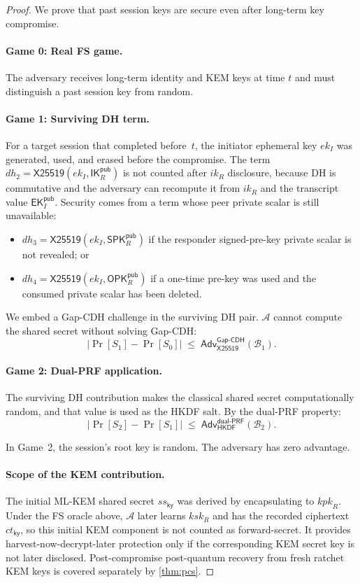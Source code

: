 \documentclass[11pt,a4paper]{article}
\theoremstyle{definition}
\theoremstyle{remark}
\newcommand{\adv}{\mathsf{Adv}}
\newcommand{\advA}{\mathcal{A}}
\newcommand{\advB}{\mathcal{B}}
\newcommand{\HKDF}{\mathsf{HKDF}}
\renewcommand{\DH}{\mathsf{X25519}}
\newcommand{\GapCDH}{\mathsf{Gap\text{-}CDH}}
\newcommand{\dualPRF}{\mathsf{dual\text{-}PRF}}
\newcommand{\IK}{\mathsf{IK}}
\newcommand{\SPK}{\mathsf{SPK}}
\newcommand{\EK}{\mathsf{EK}}
\newcommand{\OPK}{\mathsf{OPK}}
\begin{document}
\begin{proof}
We prove that past session keys are secure even after long-term key compromise.

\paragraph{Game 0: Real FS game.}
The adversary receives long-term identity and KEM keys at time $t$ and must
distinguish a past session key from random.

\paragraph{Game 1: Surviving DH term.}
For a target session that completed before~$t$, the initiator ephemeral key
$ek_I$ was generated, used, and erased before the compromise. The term
$\mathit{dh}_2=\DH(ek_I,\IK_R^{\mathsf{pub}})$ is not counted after $ik_R$
disclosure, because DH is commutative and the adversary can recompute it from
$ik_R$ and the transcript value $\EK_I^{\mathsf{pub}}$. Security comes from a
term whose peer private scalar is still unavailable:
\begin{itemize}[nosep]
  \item $\mathit{dh}_3 = \DH(ek_I, \SPK_R^{\mathsf{pub}})$ if the responder
        signed-pre-key private scalar is not revealed; or
  \item $\mathit{dh}_4 = \DH(ek_I, \OPK_R^{\mathsf{pub}})$ if a one-time
        pre-key was used and the consumed private scalar has been deleted.
\end{itemize}

We embed a Gap-CDH challenge in the surviving DH pair. $\advA$ cannot compute
the shared secret without solving Gap-CDH:
\[
  |\Pr[S_1] - \Pr[S_0]| \;\leq\; \adv^{\GapCDH}_{\DH}(\advB_1).
\]

\paragraph{Game 2: Dual-PRF application.}
The surviving DH contribution makes the classical shared secret computationally
random, and that value is used as the HKDF salt. By the dual-PRF property:
\[
  |\Pr[S_2] - \Pr[S_1]| \;\leq\; \adv^{\dualPRF}_{\HKDF}(\advB_2).
\]

In Game~2, the session's root key is random.  The adversary has zero
advantage.

\paragraph{Scope of the KEM contribution.}
The initial ML-KEM shared secret $\mathit{ss}_{\mathsf{ky}}$ was derived by
encapsulating to $\mathit{kpk}_R$.  Under the FS oracle above, $\advA$ later
learns $\mathit{ksk}_R$ and has the recorded ciphertext
$\mathit{ct}_{\mathsf{ky}}$, so this initial KEM component is not counted as
forward-secret.  It provides harvest-now-decrypt-later protection only if the
corresponding KEM secret key is not later disclosed.  Post-compromise
post-quantum recovery from fresh ratchet KEM keys is covered separately by
\cref{thm:pcs}. \qedhere
\end{proof}
\end{document}
